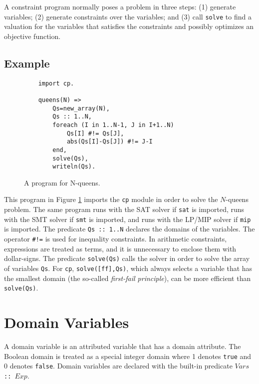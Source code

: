 A constraint program normally poses a problem in three steps: (1) generate variables; (2) generate constraints over the variables; and (3) call \texttt{solve} to find a valuation for the variables that satisfies the constraints and possibly optimizes an objective function.

\subsection*{Example}
\begin{figure}[ht]
\begin{center}
\begin{verbatim}
    import cp.

    queens(N) =>
        Qs=new_array(N),
        Qs :: 1..N,
        foreach (I in 1..N-1, J in I+1..N)
            Qs[I] #!= Qs[J],
            abs(Qs[I]-Qs[J]) #!= J-I
        end,
        solve(Qs),
        writeln(Qs).
\end{verbatim}
\end{center}
\caption{\label{fig:nqueens} A program for N-queens.}
\end{figure}

This program in Figure \ref{fig:nqueens} imports the \texttt{cp} module in order to solve the $N$-queens problem. The same program runs with the SAT solver if \texttt{sat} is imported, runs with the SMT solver if \texttt{smt} is imported, and runs with the LP/MIP solver if \texttt{mip} is imported. The predicate \texttt{Qs :: 1..N} declares the domains of the variables. The operator \verb+#!=+ is used for inequality constraints. In arithmetic constraints, expressions are treated as terms, and it is unnecessary to enclose them with dollar-signs. The predicate \texttt{solve(Qs)} calls the solver in order to solve the array of variables \texttt{Qs}. For \texttt{cp}, \texttt{solve([ff],Qs)}, which always selects a variable that has the smallest domain (the so-called \emph{first-fail principle}), can be more efficient than \texttt{solve(Qs)}.


\section{Domain Variables}
A domain variable is an attributed variable that has a domain attribute. The Boolean domain is treated as a special integer domain where 1 denotes \texttt{true} and 0 denotes \texttt{false}. Domain variables are declared with the built-in predicate \texttt{$Vars$ :: $Exp$}. 

